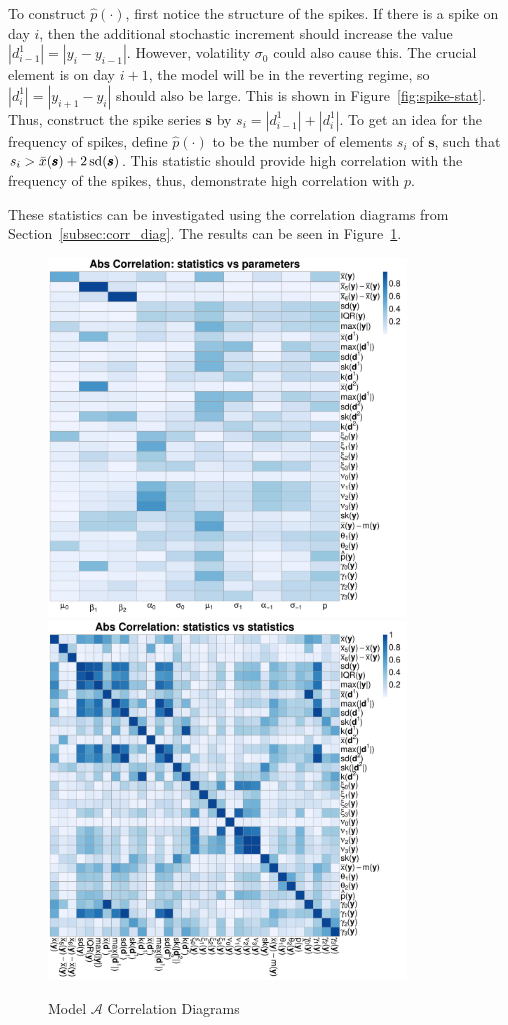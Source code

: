 To construct $\hat{p}(\cdot)$, first notice the structure of the spikes. If there is a spike on day $i$, then the additional stochastic increment should increase the value $|d^1_{i-1}| = |y_i - y_{i-1}|$. However, volatility $\sigma_0$ could also cause this. The crucial element is on day $i+1$, the model will be in the reverting regime, so $|d^1_{i}| = |y_{i+1} - y_i|$ should also be large. This is shown in Figure~\ref{fig:spike-stat}. Thus, construct the spike series $\pmb{s}$ by $s_i = |d^1_{i-1}| + |d^1_i| $. To get an idea for the frequency of spikes, define $\hat{p}(\cdot)$ to be the number of elements $s_i$ of $\pmb{s}$, such that $s_i > \bar{x}(\pmb{s}) + 2\mathop{}\!\text{sd}{(\pmb{s})}$. This statistic should provide high correlation with the frequency of the spikes, thus, demonstrate high correlation with $p$.



These statistics can be investigated using the correlation diagrams from Section~\ref{subsec:corr_diag}. The results can be seen in Figure~\ref{fig:fmcd}.

\begin{figure}[H]
        \centering
        \includegraphics[width=95mm]{images/fitting/full_model/cor_sp.pdf}
        \vspace{1cm}
        \includegraphics[width=95mm]{images/fitting/full_model/cor_ss.pdf}
        \caption{Model $\mathcal{A}$ Correlation Diagrams}
        \label{fig:fmcd}
\end{figure}


